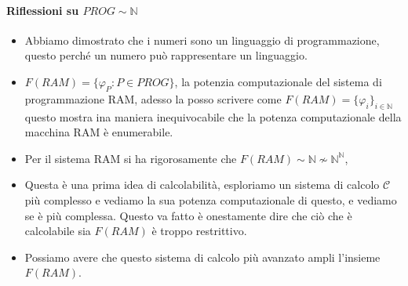 \documentclass{article}
\begin{document}
\paragraph{Riflessioni su $PROG\sim\mathbb{N}$}
\begin{itemize}
    \item Abbiamo dimostrato che i numeri sono un linguaggio di programmazione, questo
          perché un numero può rappresentare un linguaggio.

    \item $F(RAM)=\{\varphi_P :P\in PROG\}$, la potenzia computazionale del sistema di programmazione
          RAM, adesso la posso scrivere come $F(RAM)=\{\varphi_i\}_{i\in\mathbb{N}}$ questo mostra ina maniera inequivocabile che la potenza
          computazionale della macchina RAM è enumerabile.

    \item Per il sistema RAM si ha rigorosamente che $F(RAM)\sim\mathbb{N}\nsim\mathbb{N}^{\mathbb{N}}$,

    \item Questa è una prima idea di calcolabilità, esploriamo un sistema di calcolo $\mathcal{C}$ più complesso
          e vediamo la sua potenza computazionale di questo, e vediamo se è più complessa. Questo va fatto è onestamente
          dire che ciò che è calcolabile sia $F(RAM)$ è troppo restrittivo.

    \item Possiamo avere che questo sistema di calcolo più avanzato ampli l'insieme $F(RAM)$.
\end{itemize}
\end{document}
